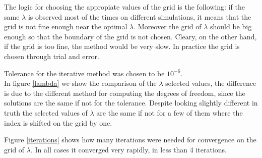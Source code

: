 The logic for choosing the appropiate values of the grid is the following: if
the same $\lambda$ is observed most of the times on different simulations, it
means that the grid is not fine enough near the optimal $\lambda$. Moreover the
grid of $\lambda$ should be big enough so that the boundary of the grid is not
chosen. Cleary, on the other hand, if the grid is too fine, the method would be
very slow. In practice the grid is chosen through trial and error.

Tolerance for the iterative method was chosen to be $10^{-6}$.\\ In figure
\ref{lambda} we show the comparison of the $\lambda$ selected values, the
difference is due to the different method for computing the degrees of freedom,
since the solutions are the same if not for the tolerance. Despite looking
slightly different in truth the selected values of $\lambda$ are the same if
not for a few of them where the index is shifted on the grid by one.

Figure \ref{iterations} shows how many iterations were needed for convergence
on the grid of $\lambda$. In all cases it converged very rapidly, in less than
4 iterations.

